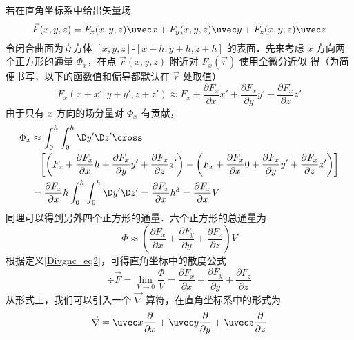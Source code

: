 若在直角坐标系中给出矢量场
\begin{equation}
\vec F(x,y,z) = {F_x}(x,y,z)\uvec x + {F_y}(x,y,z)\uvec y + {F_z}(x,y,z)\uvec z
\end{equation}
令闭合曲面为立方体 $[x,y,z]$-$[x+h,y+h,z+h]$ 的表面．先来考虑 $x$ 方向两个正方形的通量 ${\Phi _x}$，在点 $\vec r (x,y,z)$ 附近对 $F_x(\vec r)$ 使用全微分近似 得（为简便书写，以下的函数值和偏导都默认在 $\vec r$ 处取值）
\begin{equation}
{F_x}(x + x',y + y',z + z') \approx {F_x} + \frac{{\partial {F_x}}}{{\partial x}}x' + \frac{{\partial {F_x}}}{{\partial y}}y' + \frac{{\partial {F_x}}}{{\partial z}}z'
\end{equation}
由于只有 $x$ 方向的场分量对 $\Phi_x$ 有贡献，
\begin{equation}\begin{aligned}
  {\Phi _x} &\approx \int_0^h {\int_0^h {\D y'\D z'} }  \cross \\
  &\phantom{= }\left[ {\left( {{F_x} + \frac{{\partial {F_x}}}{{\partial x}}h + \frac{{\partial {F_x}}}{{\partial y}}y' + \frac{{\partial {F_x}}}{{\partial z}}z'} \right) - \left( {{F_x} + \frac{{\partial {F_x}}}{{\partial x}}0 + \frac{{\partial {F_x}}}{{\partial y}}y' + \frac{{\partial {F_x}}}{{\partial z}}z'} \right)} \right] \\
   &= \frac{{\partial {F_x}}}{{\partial x}}h\int_0^h {\int_0^h {\D y'\D z'} }  = \frac{{\partial {F_x}}}{{\partial x}}{h^3} = \frac{{\partial {F_x}}}{{\partial x}}V
\end{aligned} \end{equation}
同理可以得到另外四个正方形的通量．六个正方形的总通量为
\begin{equation}
\Phi  \approx \left( {\frac{{\partial {F_x}}}{{\partial x}} + \frac{{\partial {F_y}}}{{\partial y}} + \frac{{\partial {F_z}}}{{\partial z}}} \right)V
\end{equation}
根据定义\autoref{Divgnc_eq2}，可得直角坐标中的散度公式
\begin{equation}\label{Divgnc_eq7}
\div \vec F = \mathop {\lim }\limits_{V \to 0} \frac{\Phi }{V} = \frac{{\partial {F_x}}}{{\partial x}} + \frac{{\partial {F_y}}}{{\partial y}} + \frac{{\partial {F_z}}}{{\partial z}}
\end{equation}
从形式上，我们可以引入一个 $\vec\nabla$ 算符，在直角坐标系中的形式为
\begin{equation}
\vec\nabla  = \uvec x\frac{\partial }{{\partial x}} + \uvec y\frac{\partial }{{\partial y}} + \uvec z\frac{\partial }{{\partial z}}
\end{equation}

